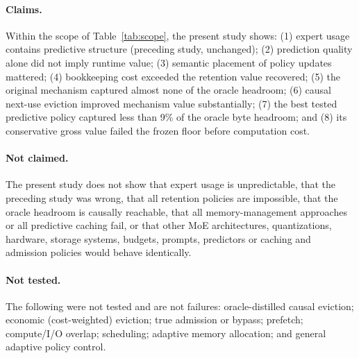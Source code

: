 \documentclass[11pt]{article}
\theoremstyle{plain}
\theoremstyle{definition}
\begin{document}
\paragraph{Claims.} Within the scope of Table~\ref{tab:scope}, the present study shows: (1) expert usage contains predictive structure (preceding study, unchanged); (2) prediction quality alone did not imply runtime value; (3) semantic placement of policy updates mattered; (4) bookkeeping cost exceeded the retention value recovered; (5) the original mechanism captured almost none of the oracle headroom; (6) causal next-use eviction improved mechanism value substantially; (7) the best tested predictive policy captured less than 9\% of the oracle byte headroom; and (8) its conservative gross value failed the frozen floor before computation cost.

\paragraph{Not claimed.} The present study does not show that expert usage is unpredictable, that the preceding study was wrong, that all retention policies are impossible, that the oracle headroom is causally reachable, that all memory-management approaches or all predictive caching fail, or that other MoE architectures, quantizations, hardware, storage systems, budgets, prompts, predictors or caching and admission policies would behave identically.

\paragraph{Not tested.} The following were not tested and are not failures: oracle-distilled causal eviction; economic (cost-weighted) eviction; true admission or bypass; prefetch; compute/I/O overlap; scheduling; adaptive memory allocation; and general adaptive policy control.
\end{document}
